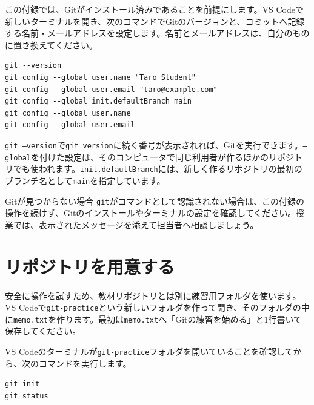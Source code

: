 この付録では、Gitがインストール済みであることを前提にします。VS Codeで新しいターミナルを開き、次のコマンドでGitのバージョンと、コミットへ記録する名前・メールアドレスを設定します。名前とメールアドレスは、自分のものに置き換えてください。

\begin{listing}[htbp]
\begin{verbatim}
git --version
git config --global user.name "Taro Student"
git config --global user.email "taro@example.com"
git config --global init.defaultBranch main
git config --global user.name
git config --global user.email
\end{verbatim}
\caption{Gitの確認と初期設定を行うコマンド}
\label{lst:appendix-git-check-config}
\end{listing}

\texttt{git --version}で\texttt{git version}に続く番号が表示されれば、Gitを実行できます。\texttt{--global}を付けた設定は、そのコンピュータで同じ利用者が作るほかのリポジトリでも使われます。\texttt{init.defaultBranch}には、新しく作るリポジトリの最初のブランチ名として\texttt{main}を指定しています。

\begin{notebox}{Gitが見つからない場合}
\texttt{git}がコマンドとして認識されない場合は、この付録の操作を続けず、Gitのインストールやターミナルの設定を確認してください。授業では、表示されたメッセージを添えて担当者へ相談しましょう。
\end{notebox}

\section{リポジトリを用意する}

安全に操作を試すため、教材リポジトリとは別に練習用フォルダを使います。VS Codeで\texttt{git-practice}という新しいフォルダを作って開き、そのフォルダの中に\texttt{memo.txt}を作ります。最初は\texttt{memo.txt}へ「Gitの練習を始める」と1行書いて保存してください。

VS Codeのターミナルが\texttt{git-practice}フォルダを開いていることを確認してから、次のコマンドを実行します。

\begin{listing}[htbp]
\begin{verbatim}
git init
git status
\end{verbatim}
\caption{現在のフォルダをGitリポジトリにするコマンド}
\label{lst:appendix-git-init}
\end{listing}

